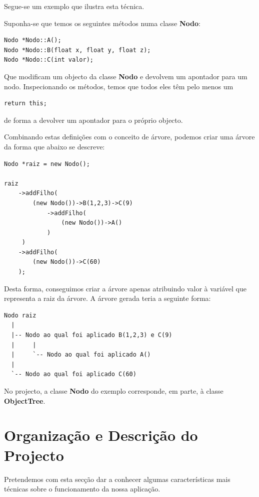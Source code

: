 \documentclass[a5paper,onecolumn, 11pt]{article}
\begin{document}
Segue-se um exemplo que ilustra esta técnica.

Suponha-se que temos os seguintes métodos numa classe \textbf{Nodo}:

\begin{verbatim}
Nodo *Nodo::A();
Nodo *Nodo::B(float x, float y, float z);
Nodo *Nodo::C(int valor);
\end{verbatim}

Que modificam um objecto da classe \textbf{Nodo} e devolvem um apontador para um nodo. Inspecionando os métodos, temos que todos eles têm pelo menos um
\begin{verbatim}
return this;
\end{verbatim}
de forma a devolver um apontador para o próprio objecto.

\clearpage
Combinando estas definições com o conceito de árvore, podemos criar uma árvore da forma que abaixo se descreve:

\begin{verbatim}
Nodo *raiz = new Nodo();

raiz
    ->addFilho(
        (new Nodo())->B(1,2,3)->C(9)
            ->addFilho(
                (new Nodo())->A()
            )
     )
    ->addFilho(
        (new Nodo())->C(60)
    );
\end{verbatim}

\clearpage
Desta forma, conseguimos criar a árvore apenas atribuindo valor à variável que representa a raiz da árvore. A árvore gerada teria a seguinte forma:

\begin{verbatim}
Nodo raiz
  |
  |-- Nodo ao qual foi aplicado B(1,2,3) e C(9)
  |     |
  |     `-- Nodo ao qual foi aplicado A()
  |
  `-- Nodo ao qual foi aplicado C(60)
\end{verbatim}

No projecto, a classe \textbf{Nodo} do exemplo corresponde, em parte, à classe \textbf{ObjectTree}.

\newpage
\onecolumn
\section{Organização e Descrição do Projecto}
Pretendemos com esta secção dar a conhecer algumas características mais técnicas sobre o funcionamento da nossa aplicação.
\end{document}
